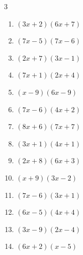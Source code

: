 \begin{multicols}{3}
\begin{enumerate}

  \item $(3x+2)(6x+7)$


  \item $(7x-5)(7x-6)$


  \item $(2x+7)(3x-1)$


  \item $(7x+1)(2x+4)$


  \item $(x-9)(6x-9)$


  \item $(7x-6)(4x+2)$


  \item $(8x+6)(7x+7)$


  \item $(3x+1)(4x+1)$


  \item $(2x+8)(6x+3)$


  \item $(x+9)(3x-2)$


  \item $(7x-6)(3x+1)$


  \item $(6x-5)(4x+4)$


  \item $(3x-9)(2x-4)$


\columnbreak %

  \item $(6x+2)(x-5)$



\end{enumerate}
\end{multicols}
